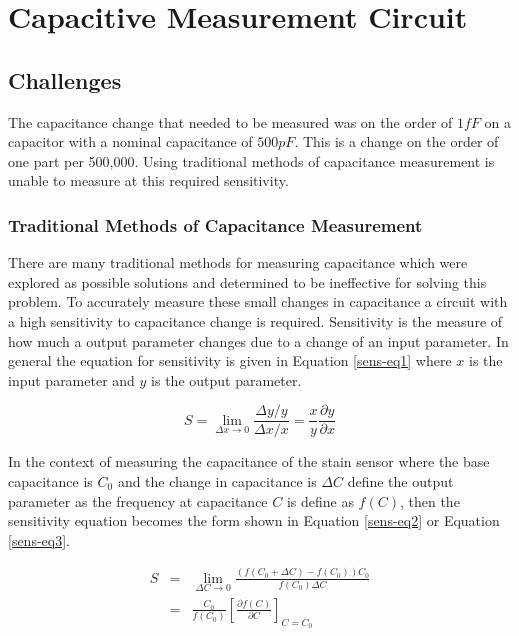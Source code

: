 \section{Capacitive Measurement Circuit}
\subsection{Challenges}
The capacitance change that needed to be measured was on the order of $1fF$ on a capacitor with a nominal capacitance of $500pF$.  This is a change on the order of one part per 500,000.  Using traditional methods of capacitance measurement is unable to measure at this required sensitivity.  

\subsubsection{Traditional Methods of Capacitance Measurement}
There are many traditional methods for measuring capacitance which were explored as possible solutions and determined to be ineffective for solving this problem.  To accurately measure these small changes in capacitance a circuit with a high sensitivity to capacitance change is required.  Sensitivity is the measure of how much a output parameter changes due to a change of an input parameter.  In general the equation for sensitivity is given in Equation \ref{sens-eq1} where $x$ is the input parameter and $y$ is the output parameter.

\begin{equation}
	S=\lim_{\Delta x\rightarrow0}\frac{\Delta y/y}{\Delta x/x}=\frac{x}{y}\frac{\partial y}{\partial x}\label{sens-eq1}
\end{equation}

In the context of measuring the capacitance of the stain sensor where the base capacitance is $C_0$ and the change in capacitance is $\Delta C$ define the output parameter as the frequency at capacitance $C$ is define as $f(C)$, then the sensitivity equation becomes the form shown in Equation \ref{sens-eq2} or Equation \ref{sens-eq3}.

\begin{eqnarray}
	S&=&\lim_{\Delta C\rightarrow 0}\frac{\left(f\left(C_0+\Delta C\right)-f\left(C_0\right)\right)C_0}{ f(C_0)\Delta C}\label{sens-eq2}\\
	&=&\frac{C_0}{f(C_0)}\left[\frac{\partial f(C)}{\partial C}\right]_{C=C_0}\label{sens-eq3}
\end{eqnarray} 

